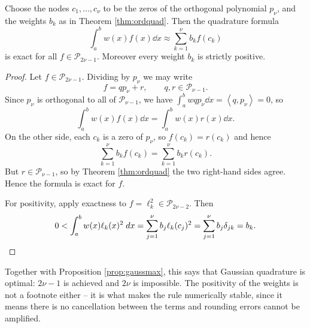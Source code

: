 \documentclass[a4paper]{scrartcl}
\newcommand{\ip}[2]{\left\langle #1, #2 \right\rangle}
\newcommand{\Pn}[1]{\mathcal{P}_{#1}}
\begin{document}
\begin{theorem}\label{na-thm:gauss}
  Choose the nodes $c_1, \dots, c_\nu$ to be the zeros of the orthogonal polynomial $p_\nu$, and the weights $b_k$ as in Theorem \ref{thm:ordquad}. Then the quadrature formula
  $$
  \int_a^b w(x)f(x)\dd x \approx \sum_{k=1}^\nu b_k f(c_k)
  $$
  is exact for all $f \in \Pn{2\nu - 1}$. Moreover every weight $b_k$ is strictly positive.
\end{theorem}
\begin{proof}
  Let $f \in \Pn{2\nu-1}$. Dividing by $p_\nu$ we may write
  $$
  f = qp_\nu + r, \qquad q, r \in \Pn{\nu-1}.
  $$
  Since $p_\nu$ is orthogonal to all of $\Pn{\nu-1}$, we have $\int_a^b w q p_\nu \dd x = \ip{q}{p_\nu} = 0$, so
  $$
  \int_a^b w(x)f(x)\dd x = \int_a^b w(x)r(x)\dd x .
  $$
  On the other side, each $c_k$ is a zero of $p_\nu$, so $f(c_k) = r(c_k)$ and hence
  $$
  \sum_{k=1}^\nu b_k f(c_k) = \sum_{k=1}^\nu b_k r(c_k).
  $$
  But $r \in \Pn{\nu - 1}$, so by Theorem \ref{thm:ordquad} the two right-hand sides agree. Hence the formula is exact for $f$.

  For positivity, apply exactness to $f = \ell_k^2 \in \Pn{2\nu-2}$. Then
  $$
  0 < \int_a^b w(x)\ell_k(x)^2 \; d x = \sum_{j=1}^\nu b_j \ell_k(c_j)^2 = \sum_{j=1}^\nu b_j \delta_{jk} = b_k. \qedhere
  $$
\end{proof}

Together with Proposition \ref{prop:gaussmax}, this says that Gaussian quadrature is optimal: $2\nu - 1$ is achieved and $2\nu$ is impossible. The positivity of the weights is not a footnote either -- it is what makes the rule numerically stable, since it means there is no cancellation between the terms and rounding errors cannot be amplified.
\end{document}
